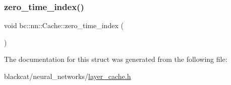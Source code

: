 \subsubsection{\texorpdfstring{zero\+\_\+time\+\_\+index()}{zero\_time\_index()}}
{\footnotesize\ttfamily void bc\+::nn\+::\+Cache\+::zero\+\_\+time\+\_\+index (\begin{DoxyParamCaption}{ }\end{DoxyParamCaption})\hspace{0.3cm}{\ttfamily [inline]}}



The documentation for this struct was generated from the following file\+:\begin{DoxyCompactItemize}
\item 
blackcat/neural\+\_\+networks/\hyperlink{layer__cache_8h}{layer\+\_\+cache.\+h}\end{DoxyCompactItemize}
